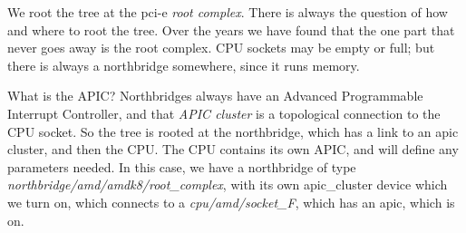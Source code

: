 \documentclass[10pt,letterpaper]{article}
\begin{document}
We root the tree at the pci-e {\it root complex}. There is always the question of how and where to root the tree. Over the years we
have found that the one part that never goes away is the root complex. CPU sockets may be empty or full; but there is always a northbridge
somewhere, since it runs memory.


What is the APIC? Northbridges always have an Advanced Programmable Interrupt Controller, and that {\it APIC cluster} is a topological connection to the
CPU socket. So the tree is rooted at the northbridge, which has a link to an apic cluster, and then the CPU. The CPU contains
its own APIC, and will define any parameters needed. In this case, we have a northbridge of type
{\it northbridge/amd/amdk8/root\_complex}, with its own apic\_cluster device which we turn on,
which connects to a {\it cpu/amd/socket\_F},
which has an apic, which is on.
\end{document}
